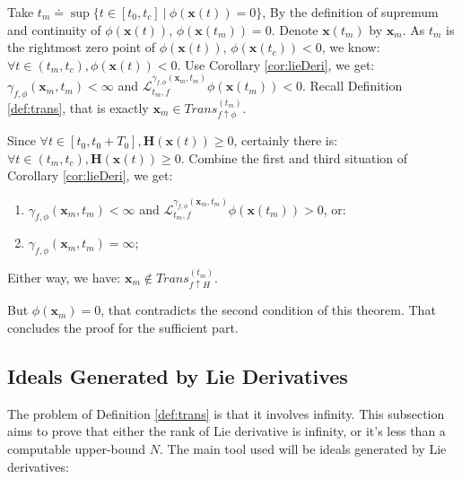 \documentclass{article}
\begin{document}
\begin{Proof}
Take $t_m \doteq \sup\{t \in [t_0, t_c]\ |\ \phi (\boldsymbol{x}(t)) = 0 \}$, By the definition of supremum and continuity of $\phi(\boldsymbol{x}(t))$, $\phi(\boldsymbol{x}(t_m)) = 0$. Denote $\boldsymbol{x}(t_m)$ by $\boldsymbol{x}_m$. As $t_m$ is the rightmost zero point of $\phi(\boldsymbol{x}(t))$, $\phi(\boldsymbol{x}(t_c)) < 0$, we know: $\forall t \in (t_m, t_c),\phi(\boldsymbol{x}(t)) < 0$. Use Corollary \ref{cor:lieDeri}, we get:  $\gamma_{f, \phi}(\boldsymbol{x}_m, t_m) < \infty$ and $\mathcal{L}_{t_m, f}^{\gamma_{f, \phi}(\boldsymbol{x}_m, t_m)} \phi (\boldsymbol{x}(t_m)) < 0$. Recall Definition \ref{def:trans}, that is exactly $\boldsymbol{x}_m \in Trans_{f \uparrow \phi}^{(t_m)}$.

Since $\forall t \in [t_0, t_0 + T_0], \boldsymbol{H}(\boldsymbol{x}(t)) \geq 0$, certainly there is: $\forall t \in (t_m, t_c),\boldsymbol{H}(\boldsymbol{x}(t)) \geq 0$. Combine the first and third situation of Corollary \ref{cor:lieDeri}, we get: 
\begin{enumerate}
	\item $\gamma_{f, \phi}(\boldsymbol{x}_m, t_m) < \infty$ and $\mathcal{L}_{t_m, f}^{\gamma_{f, \phi}(\boldsymbol{x}_m, t_m)} \phi (\boldsymbol{x}(t_m)) > 0$, or: 
	\item $\gamma_{f, \phi}(\boldsymbol{x}_m, t_m) = \infty$; 
\end{enumerate}
Either way, we have: $\boldsymbol{x}_m \notin Trans_{f \uparrow H}^{(t_m)}$.

But $\phi(\boldsymbol{x}_m) = 0$, that contradicts the second condition of this theorem. That concludes the proof for the sufficient part.
\end{Proof}

\subsection{Ideals Generated by Lie Derivatives}
\label{sub:original}
The problem of Definition \ref{def:trans} is that it involves infinity. This subsection aims to prove that either the rank of Lie derivative is infinity, or it's less than a computable upper-bound $N$. The main tool used will be ideals generated by Lie derivatives: 
\end{document}
